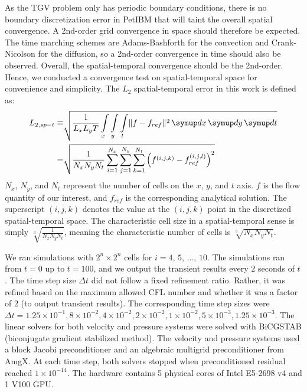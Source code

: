 As the TGV problem only has periodic boundary conditions, there is no boundary discretization error in PetIBM that will taint the overall spatial convergence.
A 2nd-order grid convergence in space should therefore be expected.
The time marching schemes are Adams-Bashforth for the convection and Crank-Nicolson for the diffusion, so a 2nd-order convergence in time should also be observed.
Overall, the spatial-temporal convergence should be the 2nd-order.
Hence, we conducted a convergence test on spatial-temporal space for  convenience and simplicity.
The $L_2$ spatial-temporal error in this work is defined as:
\begin{equation}\label{eq:spt-err-def}
    \begin{aligned}
    L_{2,sp-t} \equiv &\sqrt{
        \frac{1}{L_x L_y T}
        \int\limits_{x} \int\limits_{y} \int\limits_{t} \lVert f - f_{ref} \rVert^2 \diff x \diff y \diff t
    } \\
    = &
    \sqrt{\frac{1}{N_x N_y N_t}\sum\limits_{i=1}^{N_x}\sum\limits_{j=1}^{N_y}\sum\limits_{k=1}^{N_t}\left(f^{(i, j, k)} - f_{ref}^{(i, j, l)}\right)^2}
    \end{aligned}
\end{equation}
$N_x$, $N_y$, and $N_t$ represent the number of cells on the $x$, $y$, and $t$ axis.
$f$ is the flow quantity of our interest, and $f_{ref}$ is the corresponding analytical solution.
The superscript $(i, j, k)$ denotes the value at the $(i, j, k)$ point in the discretized spatial-temporal space.
The characteristic cell size in a spatial-temporal sense is simply $\sqrt[3]{\frac{1}{N_x N_y N_t}}$, meaning the characteristic number of cells is $\sqrt[3]{N_x N_y N_t}$.

We ran simulations with $2^{n} \times 2^{n}$ cells for $i=4$, $5$, $\dots$, $10$.
The simulations ran from $t=0$ up to $t=100$, and we output the transient results every $2$ seconds of $t$.
The time step size $\Delta t$ did not follow a fixed refinement ratio.
Rather, it was refined based on the maximum allowed CFL number and whether it was a factor of $2$ (to output transient results).
The corresponding time step sizes were $\Delta t = 1.25\times 10^{-1}, 8\times 10^{-2}, 4\times 10^{-2}, 2\times 10^{-2}, 1\times 10^{-2}, 5\times 10^{-3}, 1.25\times 10^{-3}$.
The linear solvers for both velocity and pressure systems were solved with BiCGSTAB (biconjugate gradient stabilized method).
The velocity and pressure systems used a block Jacobi preconditioner and an algebraic multigrid preconditioner from AmgX.
At each time step, both solvers stopped when preconditioned residual reached $1\times 10^{-14}$.
The hardware contains 5 physical cores of Intel E5-2698 v4 and 1 V100 GPU.

